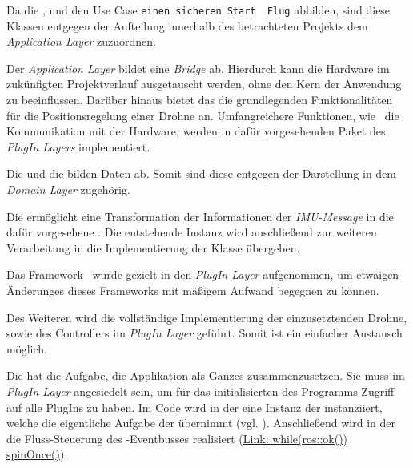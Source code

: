 Da die ,  und  den Use Case \texttt{ einen sicheren Start \bzw\ Flug\grq} abbilden, sind diese Klassen entgegen der Aufteilung innerhalb des betrachteten Projekts dem \textit{Application Layer} zuzuordnen.



Der \textit{Application Layer} bildet eine \textit{Bridge} ab. Hierdurch kann die Hardware im zukünfigten Projektverlauf ausgetauscht werden, ohne den Kern der Anwendung zu beeinflussen.
Darüber hinaus bietet das  die grundlegenden Funktionalitäten für die Positionsregelung einer Drohne an. Umfangreichere Funktionen, wie \zB\ die Kommunikation mit der Hardware, werden in dafür vorgesehenden Paket des \textit{PlugIn Layers} implementiert. 

Die  und die  bilden Daten ab. Somit sind diese entgegen der Darstellung in  dem \textit{Domain Layer} zugehörig.



Die  ermöglicht eine Transformation der Informationen der \textit{IMU-Message} in die dafür vorgesehene . Die entstehende Instanz wird anschließend zur weiteren Verarbeitung in die Implementierung der Klasse  übergeben.



Das Framework \ROS\ wurde gezielt in den \textit{PlugIn Layer} aufgenommen, um etwaigen Änderunges dieses Frameworks mit mäßigem Aufwand begegnen zu können.

Des Weiteren wird die vollständige Implementierung der einzusetztenden Drohne, sowie des Controllers im \textit{PlugIn Layer} geführt. Somit ist ein einfacher Austausch möglich.

Die  hat die Aufgabe, die Applikation als Ganzes zusammenzusetzen. Sie muss im \textit{PlugIn Layer} angesiedelt sein, um für das initialisierten des Programms Zugriff auf alle PlugIns zu haben.
Im Code wird in der  eine Instanz der  instanziiert, welche die eigentliche Aufgabe der  übernimmt (vgl. ). Anschließend wird in der  die Fluss-Steuerung des \ROS-Eventbusses realisiert (\href{https://github.com/MobMonRob/ROSLabDrohne/blob/603d50c276cbb1a44929cd096f8a4dc1ce6df855/Code/PosControl/src/Main.cpp\#L15}{Link: while(ros::ok()) spinOnce()}).










